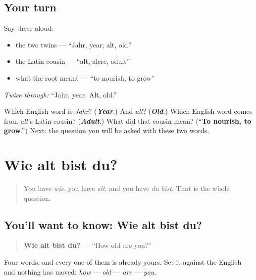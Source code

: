 \subsection*{Your turn}
Say these aloud:

\begin{itemize}
\raggedright
  \item the two twins — \textquotedblleft{}Jahr, year; alt, old\textquotedblright{}
  \item the Latin cousin — \textquotedblleft{}alt, alere, adult\textquotedblright{}
  \item what the root meant — \textquotedblleft{}to nourish, to grow\textquotedblright{}
\end{itemize}

\emph{Twice through:} \textquotedblleft{}Jahr, year. Alt, old.\textquotedblright{}

\begin{tcolorbox}[breakable,colback=teal!4,colframe=teal!35!black,title={Before you move on}]
Which English word is \emph{Jahr}? (\emph{\textbf{Year}}.) And \emph{alt}? (\emph{\textbf{Old}}.) Which English word comes from \emph{alt}'s Latin cousin? (\emph{\textbf{Adult}}.) What did that cousin mean? (\textquotedblleft{}\textbf{To nourish, to grow}.\textquotedblright{}) Next: the question you will be asked with these two words.
\end{tcolorbox}
\section[Wie alt bist du?]{Wie alt bist du?}

\label{lesson:GE-C14-wie-alt-bist-du}



\begin{quote}
You have \emph{wie}, you have \emph{alt}, and you have \emph{du bist}. That is the whole question.
\end{quote}

\subsection*{You'll want to know: Wie alt bist du?}
\begin{quote}
\textbf{Wie alt bist du?} — \textquotedblleft{}How old are you?\textquotedblright{}
\end{quote}

Four words, and every one of them is already yours. Set it against the English and nothing has moved: \emph{how} — \emph{old} — \emph{are} — \emph{you}.

